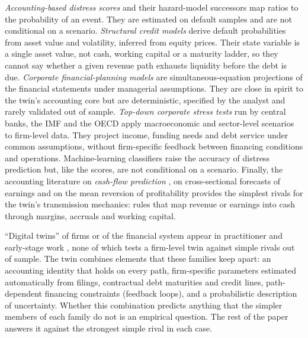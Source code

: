 \emph{Accounting-based distress scores} \citep{beaver1966,altman1968,ohlson1980,zmijewski1984} and their hazard-model successors \citep{shumway2001,chava2004,campbell2008} map ratios to the probability of an event. They are estimated on default samples and are not conditional on a scenario. \emph{Structural credit models} \citep{merton1974,leland1994} derive default probabilities from asset value and volatility, inferred from equity prices. Their state variable is a single asset value, not cash, working capital or a maturity ladder, so they cannot say whether a given revenue path exhausts liquidity before the debt is due. \emph{Corporate financial-planning models} \citep{carleton1970,warren1971} are simultaneous-equation projections of the financial statements under managerial assumptions. They are close in spirit to the twin's accounting core but are deterministic, specified by the analyst and rarely validated out of sample. \emph{Top-down corporate stress tests} run by central banks, the IMF and the OECD \citep{imf2020,roulet2020} apply macroeconomic and sector-level scenarios to firm-level data. They project income, funding needs and debt service under common assumptions, without firm-specific feedback between financing conditions and operations. Machine-learning classifiers \citep{barboza2017,mai2019,jones2017} raise the accuracy of distress prediction but, like the scores, are not conditional on a scenario. Finally, the accounting literature on \emph{cash-flow prediction} \citep{dechow1998,barth2001,kim2005,lev2010,nallareddy2020}, on cross-sectional forecasts of earnings \citep{hou2012,li2014} and on the mean reversion of profitability \citep{fama2000} provides the simplest rivals for the twin's transmission mechanics: rules that map revenue or earnings into cash through margins, accruals and working capital.

``Digital twins'' of firms or of the financial system appear in practitioner and early-stage work \citep{westphal2024,anshari2022,bhatia2026}, none of which tests a firm-level twin against simple rivals out of sample. The twin combines elements that these families keep apart: an accounting identity that holds on every path, firm-specific parameters estimated automatically from filings, contractual debt maturities and credit lines, path-dependent financing constraints (feedback loops), and a probabilistic description of uncertainty. Whether this combination predicts anything that the simpler members of each family do not is an empirical question. The rest of the paper answers it against the strongest simple rival in each case.

